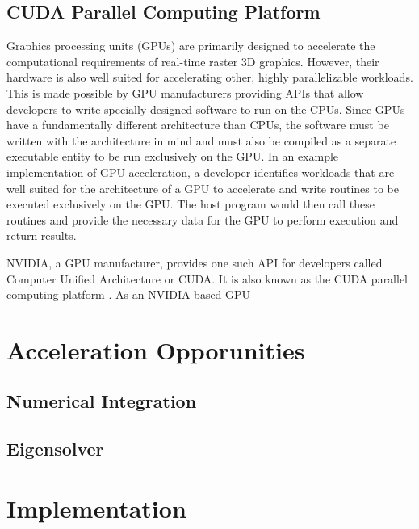 \documentclass[journal, twoside]{IEEEtran}
\begin{document}
\subsection{CUDA Parallel Computing Platform}

Graphics processing units (GPUs) are primarily designed to accelerate the computational requirements of real-time raster 3D graphics. However, their hardware is also well suited for accelerating other, highly parallelizable workloads. This is made possible by GPU manufacturers providing APIs that allow developers to write specially designed software to run on the CPUs. Since GPUs have a fundamentally different architecture than CPUs, the software must be written with the architecture in mind and must also be compiled as a separate executable entity to be run exclusively on the GPU. In an example implementation of GPU acceleration, a developer identifies workloads that are well suited for the architecture of a GPU to accelerate and write routines to be executed exclusively on the GPU. The host program would then call these routines and provide the necessary data for the GPU to perform execution and return results.

NVIDIA, a GPU manufacturer, provides one such API for developers called Computer Unified Architecture or CUDA. It is also known as the CUDA parallel computing platform \cite{nvidia-cuda}. As an NVIDIA-based GPU


\cite{nvidia-cuda}

\section{Acceleration Opporunities}

\subsection{Numerical Integration}

\subsection{Eigensolver}

\section{Implementation}
\end{document}
